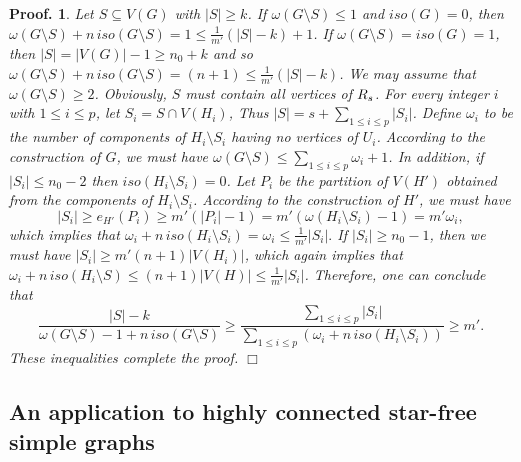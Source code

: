 \documentclass[10pt,bezier]{article}
\newtheorem{preproof}{{\bf Proof.}}
\newenvironment{proof}[1]{\begin{preproof}{\rm
#1}\hfill{$\Box$}}{\end{preproof}}
\begin{document}
\begin{proof}
{Let $S\subseteq V(G)$ with $|S|\ge k$. 
%
If $\omega(G\setminus S)\le 1$ and $iso(G)= 0$, then
$\omega(G\setminus S)+n\, iso(G\setminus S)=1 \le \frac{1}{m'}(|S|-k)+1$.
%
If $\omega(G\setminus S)=iso(G)= 1$, then $|S|= |V(G)|-1\ge n_0+k$ and so
$\omega(G\setminus S)+n\, iso(G\setminus S)=(n+1) \le \frac{1}{m'}(|S|-k)$.
 We may assume that $\omega(G\setminus S)\ge 2$. 
%
Obviously, $S$ must contain all vertices of $\text{$R_s$}$.
For every integer $i$ with $1 \le i \le p$, let $S_i=S\cap V(H_i)$, 
Thus $|S|=s+\sum_{1\le i\le p}|S_i|$.
%
Define $\omega_i$ to be the number of components of $H_i\setminus S_i$ having no vertices of $U_i$.
%
According to the construction of $G$, we must have 
$\omega(G\setminus S)\le \sum_{1\le i\le p}\omega_i+1$.
%
In addition, if $|S_i|\le n_0-2$ then $ iso(H_i\setminus S_i) =0$. 
Let $P_i$ be the partition of $V(H')$ obtained from the components of $H_i\setminus S_i$.
%
According to the construction of $H'$, we must have
$$|S_i| \ge e_{H'}(P_i) \ge m'(|P_i|-1) = m' (\omega(H_i\setminus S_i)-1)=m'\omega_i,$$
%
which implies that 
$\omega_i +n\, iso(H_i\setminus S_i) =\omega_i \le \frac{1}{m'}|S_i|.$
%
If $|S_i|\ge n_0-1$, then we must have 
 $|S_i|\ge m' (n+1)|V(H_i)|$, which again implies that
$\omega_i +n\, iso(H_i\setminus S) \le (n+1)|V(H)|\le \frac{1}{m'}|S_i|$.
%
Therefore, one can conclude that
%
$$
\frac{|S|-k}{\omega(G\setminus S)-1+n\, iso(G\setminus S)}\ge 
\frac{\sum_{1\le i\le p}|S_i|}{\sum_{1\le i\le p}(\omega_i+n\, iso(H_i\setminus S_i))}
\ge m'.$$
%
These inequalities complete the proof.
}\end{proof}
%
%
\subsection{An application to highly connected star-free simple graphs}
%
\end{document}
